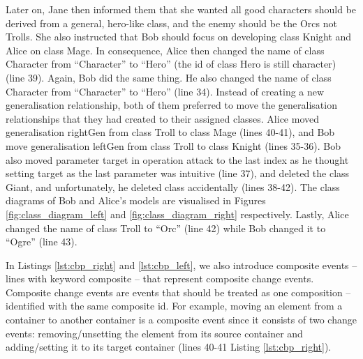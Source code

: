 Later on, Jane then informed them that she wanted all good characters should be derived from a general, hero-like class, and the enemy should be the Orcs not Trolls. She also instructed that Bob should focus on developing class \textsf{Knight} and Alice on class \textsf{Mage}. In consequence, Alice then changed the name of class \textsf{Character} from ``Character'' to ``Hero'' (the id of class \textsf{Hero} is still \textsf{character}) (line 39). Again, Bob did the same thing. He also changed the name of class \textsf{Character} from ``Character'' to ``Hero'' (line 34). Instead of creating a new generalisation relationship, both of them preferred to move the generalisation relationships that they had created to their assigned classes. Alice moved generalisation \textsf{rightGen} from class \textsf{Troll} to class \textsf{Mage} (lines 40-41), and Bob move generalisation \textsf{leftGen} from class \textsf{Troll} to class \textsf{Knight} (lines 35-36). Bob also moved parameter \textsf{target} in operation \textsf{attack} to the last index as he thought setting target as the last parameter was intuitive (line 37), and deleted the class {Giant}, and unfortunately, he deleted class  accidentally (lines 38-42). The class diagrams of Bob and Alice's models are visualised in Figures \ref{fig:class_diagram_left} and \ref{fig:class_diagram_right} respectively. Lastly, Alice changed the \textsf{name} of class \textsf{Troll} to ``Orc'' (line 42) while Bob changed it to ``Ogre'' (line 43).  

In Listings \ref{lst:cbp_right} and \ref{lst:cbp_left}, we also introduce composite events -- lines with keyword \textsf{composite} -- that represent composite change events. 
Composite change events are events that should be treated as one composition -- identified with the same composite id. 
For example, moving an element from a container to another container is a composite event since it consists of two change events: 
removing/unsetting the element from its source container and adding/setting it to its target container (lines 40-41 Listing \ref{lst:cbp_right}). 

